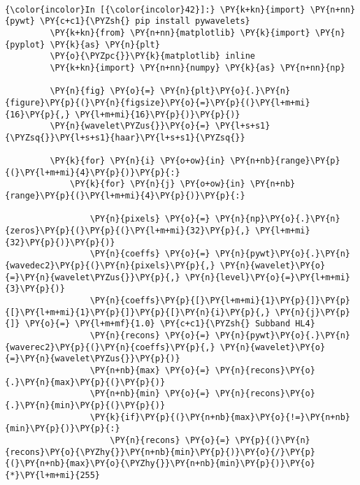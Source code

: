     \begin{center}
    \end{center}
    { \hspace*{\fill} \\}
    
    \begin{Verbatim}[commandchars=\\\{\}]
{\color{incolor}In [{\color{incolor}42}]:} \PY{k+kn}{import} \PY{n+nn}{pywt} \PY{c+c1}{\PYZsh{} pip install pywavelets}
         \PY{k+kn}{from} \PY{n+nn}{matplotlib} \PY{k}{import} \PY{n}{pyplot} \PY{k}{as} \PY{n}{plt}
         \PY{o}{\PYZpc{}}\PY{k}{matplotlib} inline
         \PY{k+kn}{import} \PY{n+nn}{numpy} \PY{k}{as} \PY{n+nn}{np}
         
         \PY{n}{fig} \PY{o}{=} \PY{n}{plt}\PY{o}{.}\PY{n}{figure}\PY{p}{(}\PY{n}{figsize}\PY{o}{=}\PY{p}{(}\PY{l+m+mi}{16}\PY{p}{,} \PY{l+m+mi}{16}\PY{p}{)}\PY{p}{)}
         \PY{n}{wavelet\PYZus{}}\PY{o}{=} \PY{l+s+s1}{\PYZsq{}}\PY{l+s+s1}{haar}\PY{l+s+s1}{\PYZsq{}}
         
         \PY{k}{for} \PY{n}{i} \PY{o+ow}{in} \PY{n+nb}{range}\PY{p}{(}\PY{l+m+mi}{4}\PY{p}{)}\PY{p}{:}
             \PY{k}{for} \PY{n}{j} \PY{o+ow}{in} \PY{n+nb}{range}\PY{p}{(}\PY{l+m+mi}{4}\PY{p}{)}\PY{p}{:}
         
                 \PY{n}{pixels} \PY{o}{=} \PY{n}{np}\PY{o}{.}\PY{n}{zeros}\PY{p}{(}\PY{p}{(}\PY{l+m+mi}{32}\PY{p}{,} \PY{l+m+mi}{32}\PY{p}{)}\PY{p}{)}
                 \PY{n}{coeffs} \PY{o}{=} \PY{n}{pywt}\PY{o}{.}\PY{n}{wavedec2}\PY{p}{(}\PY{n}{pixels}\PY{p}{,} \PY{n}{wavelet}\PY{o}{=}\PY{n}{wavelet\PYZus{}}\PY{p}{,} \PY{n}{level}\PY{o}{=}\PY{l+m+mi}{3}\PY{p}{)}
                 \PY{n}{coeffs}\PY{p}{[}\PY{l+m+mi}{1}\PY{p}{]}\PY{p}{[}\PY{l+m+mi}{1}\PY{p}{]}\PY{p}{[}\PY{n}{i}\PY{p}{,} \PY{n}{j}\PY{p}{]} \PY{o}{=} \PY{l+m+mf}{1.0} \PY{c+c1}{\PYZsh{} Subband HL4}
                 \PY{n}{recons} \PY{o}{=} \PY{n}{pywt}\PY{o}{.}\PY{n}{waverec2}\PY{p}{(}\PY{n}{coeffs}\PY{p}{,} \PY{n}{wavelet}\PY{o}{=}\PY{n}{wavelet\PYZus{}}\PY{p}{)}
                 \PY{n+nb}{max} \PY{o}{=} \PY{n}{recons}\PY{o}{.}\PY{n}{max}\PY{p}{(}\PY{p}{)}
                 \PY{n+nb}{min} \PY{o}{=} \PY{n}{recons}\PY{o}{.}\PY{n}{min}\PY{p}{(}\PY{p}{)}
                 \PY{k}{if}\PY{p}{(}\PY{n+nb}{max}\PY{o}{!=}\PY{n+nb}{min}\PY{p}{)}\PY{p}{:}
                     \PY{n}{recons} \PY{o}{=} \PY{p}{(}\PY{n}{recons}\PY{o}{\PYZhy{}}\PY{n+nb}{min}\PY{p}{)}\PY{o}{/}\PY{p}{(}\PY{n+nb}{max}\PY{o}{\PYZhy{}}\PY{n+nb}{min}\PY{p}{)}\PY{o}{*}\PY{l+m+mi}{255}
         

\end{Verbatim}
